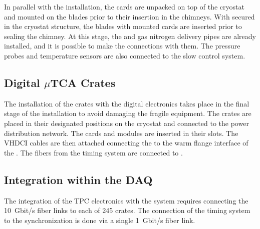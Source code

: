 In parallel with the  installation, the  cards are unpacked on top of the cryostat and mounted on the blades prior to their insertion in the chimneys.  
With  secured in the cryostat structure, the blades with mounted  cards %
are inserted prior to sealing the chimney.
At this stage, the \lar and gas nitrogen delivery pipes are already installed, and  
it is possible to make the connections with them. The pressure probes and temperature sensors are also connected to the slow control system.

\subsection{Digital $\mu$TCA Crates}
\label{ssec:dp-tpcelec-install-utca}

The installation of the  crates with the digital electronics takes place in the final stage of the  installation to avoid damaging the fragile equipment. The crates are placed in their designated positions on the cryostat and connected to the power distribution network. The  cards and  modules are inserted in their slots. The VHDCI cables are then attached connecting the   to the warm flange interface of the .  The fibers from the timing system are connected to . 

\subsection{Integration within the DAQ}
\label{ssec:dp-tpcelec-install-daq}

The integration of the \dual TPC electronics with the  system requires connecting the \SI{10}{Gbit/s} fiber links to each of \num{245}  crates. The connection of the timing system to the synchronization  is done via a single \SI{1}{Gbit/s} fiber link. 

